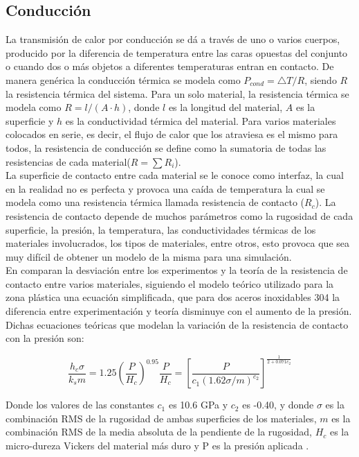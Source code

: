 \subsection{Conducción}
La transmisión de calor por conducción se dá a través de uno o varios cuerpos, producido por la diferencia de temperatura entre las caras opuestas del conjunto o cuando dos o más objetos a diferentes temperaturas entran en contacto. De manera genérica la conducción térmica se modela como $P_{cond}={\bigtriangleup T}/{R} $, siendo $R$ la resistencia térmica del sistema.
Para un solo material, la resistencia térmica se modela como $R = l/{\left(A\cdot h\right)}$, donde $l$ es la longitud del material, $A$ es la superficie y $h$ es la conductividad térmica del material. Para varios materiales colocados en serie, es decir, el flujo de calor que los atraviesa es el mismo para todos, la resistencia de conducción se define como la sumatoria de todas las resistencias de cada material($R=\sum R_i$).\\

La superficie de contacto entre cada material se le conoce como interfaz, la cual en la realidad no es perfecta y provoca una caída de temperatura la cual se modela como una resistencia térmica llamada resistencia de contacto ($R_c$). La resistencia de contacto depende de muchos parámetros como la rugosidad de cada superficie, la presión, la temperatura, las conductividades térmicas de los materiales involucrados, los tipos de materiales, entre otros, esto provoca que sea muy difícil de obtener un modelo de la misma para una simulación.\\

En \cite{experimental_Rc_SS} comparan la desviación entre los experimentos y la teoría de la resistencia de contacto entre varios materiales, siguiendo el modelo teórico utilizado para la zona plástica una ecuación simplificada, que para dos aceros inoxidables 304 la diferencia entre experimentación y teoría disminuye con el aumento de la presión. Dichas ecuaciones teóricas que modelan la variación de la resistencia de contacto con la presión son:


\begin{subequations}
\begin{equation}
\dfrac{h_c\sigma}{k_sm}=1.25\left(\dfrac{P}{H_c}\right)^{0.95}
\label{eq:correlacionCooperSimplificadaYovanovich}
\end{equation}
\begin{equation}
\dfrac{P}{H_c}=\left[ \dfrac{P}{c_1\left(1.62\sigma/m\right)^{c_2}} \right]^{\frac{1}{2+0.071c_2}}
\label{eq:modeloYovanovich}
\end{equation}
\label{eqs:}
\end{subequations}

Donde los valores de las constantes $c_1$ es 10.6 GPa y $c_2$ es -0.40, y donde $\sigma$ es la combinación RMS de la rugosidad de ambas superficies de los materiales, $m$ es la combinación RMS de la media absoluta de la pendiente de la rugosidad, $H_c$ es la micro-dureza Vickers del material más duro y P es la presión aplicada \cite{experimental_Rc_SS}.